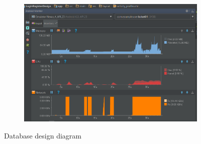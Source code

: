 \documentclass{article}
\begin{document}
\begin{figure}[H]
	\begin{subfigure}{\linewidth}
		\centering
		\includegraphics[width=.8\linewidth]{androidtesting.png}\hfill
	\end{subfigure}\par\medskip
	\caption{Database design diagram}
\end{figure}
\end{document}
